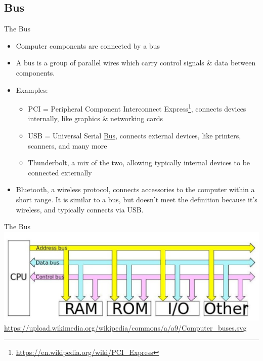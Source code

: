 \documentclass[graphics]{beamer}
\begin{document}
\subsection{Bus}
\begin{frame}{The Bus}
    \begin{itemize}
        \item Computer components are connected by a bus
        \item A bus is a group of parallel wires which carry control signals \& data between components.
        \item Examples:
        \begin{itemize}
            \item PCI = Peripheral Component Interconnect Express\footnote{\url{https://en.wikipedia.org/wiki/PCI_Express}}, connects devices internally, like graphics \& networking cards
            \item USB = Universal Serial \underline{Bus}, connects external devices, like printers, scanners, and many more
            \item Thunderbolt, a mix of the two, allowing typically internal devices to be connected externally
        \end{itemize}
        \item Bluetooth, a wireless protocol, connects accessories to the computer within a short range. It is similar to a bus, but doesn't meet the definition because it's wireless, and typically connects via USB.
    \end{itemize}
\end{frame}

\begin{frame}{The Bus}
    \includegraphics[scale=0.36]{L02_ArchNumbersSystems/L2_buses.jpg}
    \footnotesize{\url{https://upload.wikimedia.org/wikipedia/commons/a/a9/Computer_buses.svg}}
\end{frame}
\end{document}
